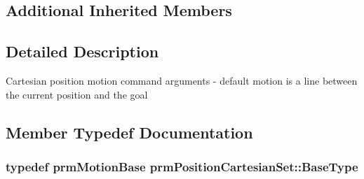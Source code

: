 \subsection*{Additional Inherited Members}


\subsection{Detailed Description}
Cartesian position motion command arguments -\/ default motion is a line between the current position and the goal 

\subsection{Member Typedef Documentation}
\hypertarget{classprm_position_cartesian_set_ad8d7923e983724ee18081a6fcf1ebce8}{
\subsubsection[{Base\-Type}]{\setlength{\rightskip}{0pt plus 5cm}typedef {\bf prm\-Motion\-Base} {\bf prm\-Position\-Cartesian\-Set\-::\-Base\-Type}\hspace{0.3cm}{\ttfamily [protected]}}}\label{classprm_position_cartesian_set_ad8d7923e983724ee18081a6fcf1ebce8}


